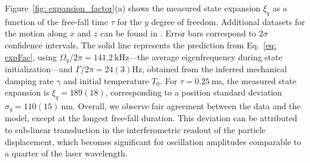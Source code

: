 \documentclass[twocolumn,preprintnumbers,superscriptaddress,amsmath,amssymb,aps,pra,10pt]{revtex4-1}
\newcommand{\<}{\langle}
\renewcommand{\>}{\rangle}
\renewcommand{\>}{\rangle}
\begin{document}
Figure~\ref{fig: expansion_factor}(a) shows the measured state expansion $\xi_q$ as a function of the free-fall time $\tau$ for the $y$ degree of freedom. 
%
Additional datasets for the motion along $x$ and $z$ can be found in \cite{supplemental}.
%
Error bars correspond to $2\sigma$ confidence intervals.
%
The solid line represents the prediction from Eq.~\ref{eq: expFac}, using $\Omega_y/2\pi = 141.2~\mathrm{kHz}$—the average eigenfrequency during state initialization—and $\Gamma/2\pi = 24(3)\mathrm{Hz}$, obtained from the inferred mechanical damping rate $\gamma$ and initial temperature $T_0$.
%
For $\tau=0.25~\mathrm{ms}$, the measured state expansion is $\xi_q = 189(18)$, corresponding to a position standard deviation $\sigma_q=110(15)~\mathrm{nm}$.
%
Overall, we observe fair agreement between the data and the model, except at the longest free-fall duration.
%
This deviation can be attributed to sub-linear transduction in the interferometric readout of the particle displacement, which becomes significant for oscillation amplitudes comparable to a quarter of the laser wavelength.  
\end{document}
